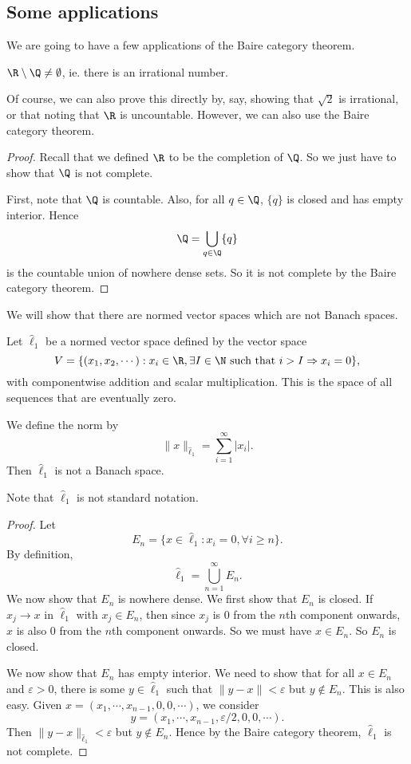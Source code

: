 \documentclass[a4paper]{article}
\begin{document}
\subsection{Some applications}
We are going to have a few applications of the Baire category theorem.

\begin{prop}
  $\R \setminus \Q \not= \emptyset$, ie. there is an irrational number.
\end{prop}
Of course, we can also prove this directly by, say, showing that $\sqrt{2}$ is irrational, or that noting that $\R$ is uncountable. However, we can also use the Baire category theorem.

\begin{proof}
  Recall that we defined $\R$ to be the completion of $\Q$. So we just have to show that $\Q$ is not complete.

  First, note that $\Q$ is countable. Also, for all $q \in \Q$, $\{q\}$ is closed and has empty interior. Hence
  \[
    \Q = \bigcup_{q \in \Q}\{q\}
  \]
  is the countable union of nowhere dense sets. So it is not complete by the Baire category theorem.
\end{proof}

We will show that there are normed vector spaces which are not Banach spaces.
\begin{prop}
  Let $\hat{\ell}_1$ be a normed vector space defined by the vector space
  \[
    V = \{(x_1, x_2, \cdots): x_i \in \R, \exists I \in \N \text{ such that } i > I \Rightarrow x_i = 0\},
  \]
  with componentwise addition and scalar multiplication. This is the space of all sequences that are eventually zero.

  We define the norm by
  \[
    \|x\|_{\hat{\ell}_1} = \sum_{i = 1}^\infty |x_i|.
  \]
  Then $\hat{\ell}_1$ is not a Banach space.
\end{prop}
Note that $\hat{\ell}_1$ is not standard notation.

\begin{proof}
  Let
  \[
    E_n = \{x\in \hat{\ell}_1: x_i = 0, \forall i \geq n\}.
  \]
  By definition,
  \[
    \hat{\ell}_1 = \bigcup_{n = 1}^\infty E_n.
  \]
  We now show that $E_n$ is nowhere dense. We first show that $E_n$ is closed. If $x_j \to x$ in $\hat{\ell}_1$ with $x_j \in E_n$, then since $x_j$ is $0$ from the $n$th component onwards, $x$ is also $0$ from the $n$th component onwards. So we must have $x \in E_n$. So $E_n$ is closed.

  We now show that $E_n$ has empty interior. We need to show that for all $x\in E_n$ and $\varepsilon > 0$, there is some $y \in \hat{\ell}_1$ such that $\|y - x\| < \varepsilon$ but $y\not\in E_n$. This is also easy. Given $x = (x_1, \cdots, x_{n - 1}, 0, 0, \cdots)$, we consider
  \[
    y = (x_1, \cdots, x_{n - 1}, \varepsilon/2, 0, 0,\cdots).
  \]
  Then $\|y - x\|_{\hat{\ell}_1} < \varepsilon$ but $y \not\in E_n$. Hence by the Baire category theorem, $\hat{\ell}_1$ is not complete.
\end{proof}
\end{document}

